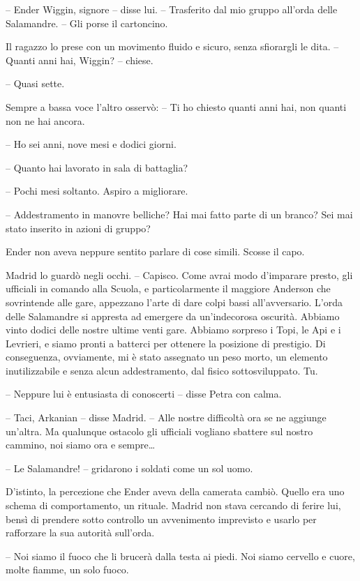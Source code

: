 {-- Ender Wiggin, signore -- disse lui. -- Trasferito dal mio gruppo
	all'orda delle Salamandre. -- Gli porse il cartoncino.}

{Il ragazzo lo prese con un movimento fluido e sicuro, senza sfiorargli
	le dita. -- Quanti anni hai, Wiggin? -- chiese.}

{-- Quasi sette.}

{Sempre a bassa voce l'altro osservò: -- Ti ho chiesto quanti anni hai,
	non quanti non ne hai ancora.}

{-- Ho sei anni, nove mesi e dodici giorni.}

{-- Quanto hai lavorato in sala di battaglia?}

{-- Pochi mesi soltanto. Aspiro a migliorare.}

{-- Addestramento in manovre belliche? Hai mai fatto parte di un branco?
	Sei mai stato inserito in azioni di gruppo?}

{Ender non aveva neppure sentito parlare di cose simili. Scosse il
	capo.}

{Madrid lo guardò negli occhi. -- Capisco. Come avrai modo d'imparare
	presto, gli ufficiali in comando alla Scuola, e particolarmente il
	maggiore Anderson che sovrintende alle gare, appezzano l'arte di dare
	colpi bassi all'avversario. L'orda delle Salamandre si appresta ad
	emergere da un'indecorosa oscurità. Abbiamo vinto dodici delle nostre
	ultime venti gare. Abbiamo sorpreso i Topi, le Api e i Levrieri, e siamo
	pronti a batterci per ottenere la posizione di prestigio. Di
	conseguenza, ovviamente, mi è stato assegnato un peso morto, un elemento
	inutilizzabile e senza alcun addestramento, dal fisico sottosviluppato.
	Tu.}

{-- Neppure lui è entusiasta di conoscerti -- disse Petra con calma.}

{-- Taci, Arkanian -- disse Madrid. -- Alle nostre difficoltà ora se ne
	aggiunge un'altra. Ma qualunque ostacolo gli ufficiali vogliano sbattere
	sul nostro cammino, noi siamo ora e sempre\ldots{}}

{-- Le Salamandre! -- gridarono i soldati come un sol uomo.}

{D'istinto, la percezione che Ender aveva della camerata cambiò. Quello
	era uno schema di comportamento, un rituale. Madrid non stava cercando
	di ferire lui, bensì di prendere sotto controllo un avvenimento
	imprevisto e usarlo per rafforzare la sua autorità sull'orda.}

{-- Noi siamo il fuoco che li brucerà dalla testa ai piedi. Noi siamo
	cervello e cuore, molte fiamme, un solo fuoco.}

